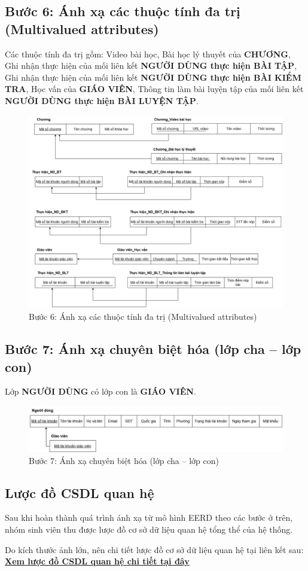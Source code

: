 \subsection{Bước 6: Ánh xạ các thuộc tính đa trị (Multivalued	attributes)} \vspace{-4pt}
Các thuộc tính đa trị gồm: Video bài học, Bài học lý thuyết của \textbf{CHƯƠNG}, Ghi nhận thực hiện của mối liên kết \textbf{NGƯỜI DÙNG thực hiện BÀI TẬP}, Ghi nhận thực hiện của mối liên kết \textbf{NGƯỜI DÙNG thực hiện BÀI KIỂM TRA}, Học vấn của \textbf{GIÁO VIÊN}, Thông tin làm bài luyện tập của mối liên kết \textbf{NGƯỜI DÙNG thực hiện BÀI LUYỆN TẬP}.
\begin{figure}[H]
    \centering
    \includegraphics[width=1\linewidth]{picture/datri.png}
    \caption{Bước 6: Ánh xạ các thuộc tính đa trị (Multivalued	attributes)}
    \label{fig:placeholder}
\end{figure}
\subsection{Bước 7: Ánh xạ chuyên biệt hóa (lớp cha – lớp con)}
Lớp \textbf{NGƯỜI DÙNG} có lớp con là \textbf{GIÁO VIÊN}.
\begin{figure}[H]
    \centering
    \includegraphics[width=1\linewidth]{picture/chacon.jpg}
    \caption{Bước 7: Ánh xạ chuyên biệt hóa (lớp cha – lớp con)}
    \label{fig:placeholder}
\end{figure}
\subsection{Lược đồ CSDL quan hệ}
Sau khi hoàn thành quá trình ánh xạ từ mô hình EERD theo các bước ở trên, nhóm sinh viên thu được lược đồ cơ sở dữ liệu quan hệ tổng thể của hệ thống.

Do kích thước ảnh lớn, nên chi tiết lược đồ cơ sở dữ liệu quan hệ tại liên kết sau: \href{https://app.diagrams.net/#G1XY2dIsVTmTCCmIWk3s_vGwzFGodUWAKx#%7B%22pageId%22%3A%22-LdK67kZfuuGv4pFiIZr%22%7D}{\textbf{Xem lược đồ CSDL quan hệ chi tiết tại đây}}
